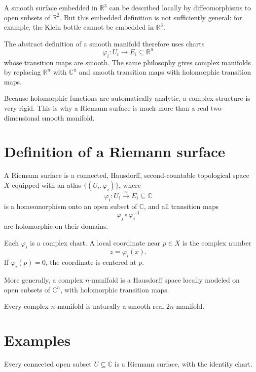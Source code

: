 A smooth surface embedded in \(\mathbb R^3\) can be described locally by diffeomorphisms to open subsets of \(\mathbb R^2\).  But this embedded definition is not sufficiently general: for example, the Klein bottle cannot be embedded in \(\mathbb R^3\).

The abstract definition of a smooth manifold therefore uses charts
\[
  \varphi_i:U_i\to E_i\subseteq\mathbb R^n
\]
whose transition maps are smooth.  The same philosophy gives complex manifolds by replacing \(\mathbb R^n\) with \(\mathbb C^n\) and smooth transition maps with holomorphic transition maps.

\begin{remark}
Because holomorphic functions are automatically analytic, a complex structure is very rigid.  This is why a Riemann surface is much more than a real two-dimensional smooth manifold.
\end{remark}

\section{Definition of a Riemann surface}

\begin{definition}
A Riemann surface is a connected, Hausdorff, second-countable topological space \(X\) equipped with an atlas \(\{(U_i,\varphi_i)\}\), where
\[
  \varphi_i:U_i\xrightarrow{\sim}E_i\subseteq\mathbb C
\]
is a homeomorphism onto an open subset of \(\mathbb C\), and all transition maps
\[
  \varphi_j\circ\varphi_i^{-1}
\]
are holomorphic on their domains.
\end{definition}

Each \(\varphi_i\) is a complex chart.  A local coordinate near \(p\in X\) is the complex number
\[
  z=\varphi_i(x).
\]
If \(\varphi_i(p)=0\), the coordinate is centered at \(p\).

\begin{definition}
More generally, a complex \(n\)-manifold is a Hausdorff space locally modeled on open subsets of \(\mathbb C^n\), with holomorphic transition maps.
\end{definition}

Every complex \(n\)-manifold is naturally a smooth real \(2n\)-manifold.

\section{Examples}

\begin{example}
Every connected open subset \(U\subseteq\mathbb C\) is a Riemann surface, with the identity chart.
\end{example}

